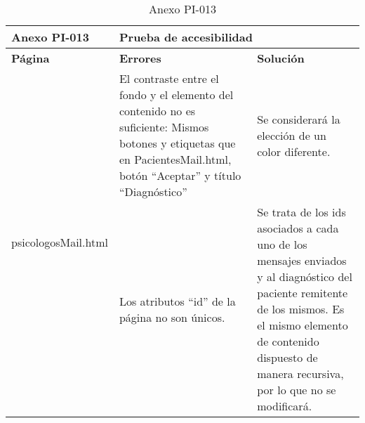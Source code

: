 \begin{table}[htpb]
\centering
\begin{tabularx}{\textwidth}{|l|X|X|}
\hline
\textbf{Anexo PI-013} & \multicolumn{2}{l|}{\textbf{Prueba de accesibilidad}}                                                                                                                                                                                                                                                                                                                                     \\ \hline
\textbf{Página}       & \textbf{Errores}                                                                                                                                                 & \textbf{Solución}                                                                                                                                                                                                      \\ \hline
\multirow{2}{*}{psicologosMail.html}   & El contraste entre el fondo y el elemento del contenido no es suficiente: Mismos botones y etiquetas que en PacientesMail.html, botón “Aceptar” y título “Diagnóstico” & Se considerará la elección de un color diferente.                                                                                                                                                                      \\ \cline{2-3} 
                      & Los atributos “id” de la página no son únicos.                                                                                                                   & Se trata de los ids asociados a cada uno de los mensajes enviados y al diagnóstico del paciente remitente de los mismos. Es el mismo elemento de contenido dispuesto de manera recursiva, por lo que no se modificará. \\ \hline
\end{tabularx}
\caption{Anexo PI-013}
\end{table}



